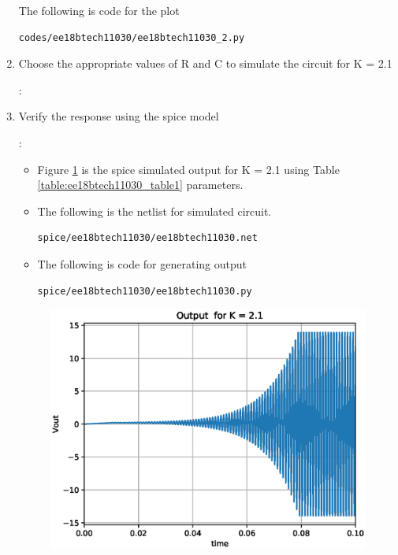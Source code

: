 \begin{enumerate}[label=\arabic*.,ref=\theenumi]
The following is code for the plot
\begin{lstlisting}
codes/ee18btech11030/ee18btech11030_2.py
\end{lstlisting}

\item Choose the appropriate values of R and C to simulate the circuit for K = 2.1

\solution:
\begin{table}[!ht]
\centering

\caption{}
\label{table:ee18btech11030_table1}
\end{table}
\item Verify the response using the spice model

\solution :

\begin{itemize}
    \item Figure \ref{fig:ee18btech11030_fig8} is the spice simulated output for K = 2.1 using Table \ref{table:ee18btech11030_table1} parameters.
    \item The following is the netlist for simulated circuit.
\begin{lstlisting}
spice/ee18btech11030/ee18btech11030.net
\end{lstlisting}
    \item The following is code for generating output
\begin{lstlisting}
spice/ee18btech11030/ee18btech11030.py
\end{lstlisting}
    
\end{itemize}
\begin{figure}[!ht]
\centering
  \includegraphics[width=\columnwidth]{./figs/ee18btech11030/ee18btech11030_spice_fc3.eps}
\caption{}
\label{fig:ee18btech11030_fig8} 
\end{figure}


\end{enumerate}
